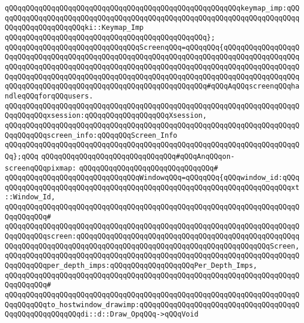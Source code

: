 \newline
\verb|qQQqqQQqqQQqqQQqqQQqqQQqqQQqqQQqqQQqqQQqqQQqqQQqqQQqqQQqkeymap_imp:qQQqqQQqqQQqqQQqqQQqqQQqqQQqqQQqqQQqqQQqqQQqqQQqqQQqqQQqqQQqqQQqqQQqqQQqqQQqqQQqqQQqqQQqqQQqki::Keymap_Imp|\newline
\verb|qQQqqQQqqQQqqQQqqQQqqQQqqQQqqQQqqQQqqQQqqQQqqQQq};|\newline
\newline
\verb|qQQqqQQqqQQqqQQqqQQqqQQqqQQqqQQqScreenqQQq=qQQqqQQq{qQQqqQQqqQQqqQQqqQQqqQQqqQQqqQQqqQQqqQQqqQQqqQQqqQQqqQQqqQQqqQQqqQQqqQQqqQQqqQQqqQQqqQQqqQQqqQQqqQQqqQQqqQQqqQQqqQQqqQQqqQQqqQQqqQQqqQQqqQQqqQQqqQQqqQQqqQQqqQQqqQQqqQQqqQQqqQQqqQQqqQQqqQQqqQQqqQQqqQQqqQQqqQQqqQQqqQQqqQQqqQQqqQQqqQQqqQQqqQQqqQQqqQQqqQQqqQQqqQQqqQQqqQQqqQQqqQQq#qQQqAqQQqscreenqQQqhandleqQQqforqQQqusers.|\newline
\verb|qQQqqQQqqQQqqQQqqQQqqQQqqQQqqQQqqQQqqQQqqQQqqQQqqQQqqQQqqQQqqQQqqQQqqQQqqQQqqQQqxsession:qQQqqQQqqQQqqQQqqQQqXsession,|\newline
\verb|qQQqqQQqqQQqqQQqqQQqqQQqqQQqqQQqqQQqqQQqqQQqqQQqqQQqqQQqqQQqqQQqqQQqqQQqqQQqqQQqscreen_info:qQQqqQQqScreen_Info|\newline
\verb|qQQqqQQqqQQqqQQqqQQqqQQqqQQqqQQqqQQqqQQqqQQqqQQqqQQqqQQqqQQqqQQqqQQqqQQq};qQQq|\newline
\newline
\verb|qQQqqQQqqQQqqQQqqQQqqQQqqQQqqQQq#qQQqAnqQQqon-screenqQQqpixmap:|\newline
\verb|qQQqqQQqqQQqqQQqqQQqqQQqqQQqqQQq#|\newline
\verb|qQQqqQQqqQQqqQQqqQQqqQQqqQQqqQQqWindowqQQq=qQQqqQQq{qQQqwindow_id:qQQqqQQqqQQqqQQqqQQqqQQqqQQqqQQqqQQqqQQqqQQqqQQqqQQqqQQqqQQqqQQqqQQqqQQqxt::Window_Id,|\newline
\verb|qQQqqQQqqQQqqQQqqQQqqQQqqQQqqQQqqQQqqQQqqQQqqQQqqQQqqQQqqQQqqQQqqQQqqQQqqQQqqQQq#|\newline
\verb|qQQqqQQqqQQqqQQqqQQqqQQqqQQqqQQqqQQqqQQqqQQqqQQqqQQqqQQqqQQqqQQqqQQqqQQqqQQqqQQqscreen:qQQqqQQqqQQqqQQqqQQqqQQqqQQqqQQqqQQqqQQqqQQqqQQqqQQqqQQqqQQqqQQqqQQqqQQqqQQqqQQqqQQqqQQqqQQqqQQqqQQqqQQqqQQqqQQqqQQqScreen,|\newline
\verb|qQQqqQQqqQQqqQQqqQQqqQQqqQQqqQQqqQQqqQQqqQQqqQQqqQQqqQQqqQQqqQQqqQQqqQQqqQQqqQQqper_depth_imps:qQQqqQQqqQQqqQQqqQQqPer_Depth_Imps,|\newline
\verb|qQQqqQQqqQQqqQQqqQQqqQQqqQQqqQQqqQQqqQQqqQQqqQQqqQQqqQQqqQQqqQQqqQQqqQQqqQQqqQQq#|\newline
\verb|qQQqqQQqqQQqqQQqqQQqqQQqqQQqqQQqqQQqqQQqqQQqqQQqqQQqqQQqqQQqqQQqqQQqqQQqqQQqqQQqto_hostwindow_drawimp:qQQqqQQqqQQqqQQqqQQqqQQqqQQqqQQqqQQqqQQqqQQqqQQqqQQqqQQqdi::d::Draw_OpqQQq->qQQqVoid|\newline
